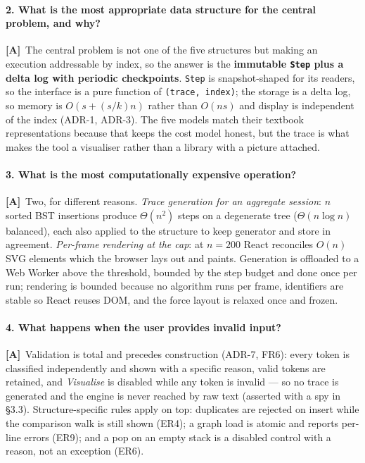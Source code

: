 \documentclass[11pt,a4paper]{article}
\newcommand{\A}{\textcolor{asmc}{\textbf{[A]}}}     %
\newcommand{\ct}[1]{\texttt{#1}}
\begin{document}
\paragraph{2. What is the most appropriate data structure for the central problem, and why?}
\A\ The central problem is not one of the five structures but making an execution addressable by
index, so the answer is the \textbf{immutable \ct{Step} plus a delta log with periodic
checkpoints}. \ct{Step} is snapshot-shaped for its readers, so the interface is a pure function
of \ct{(trace, index)}; the storage is a delta log, so memory is $O(s + (s/k)n)$ rather than
$O(ns)$ and display is independent of the index (ADR-1, ADR-3). The five models match their
textbook representations because that keeps the cost model honest, but the trace is what makes
the tool a visualiser rather than a library with a picture attached.

\paragraph{3. What is the most computationally expensive operation?}
\A\ Two, for different reasons. \emph{Trace generation for an aggregate session}: $n$ sorted BST
insertions produce $\Theta(n^2)$ steps on a degenerate tree ($\Theta(n\log n)$ balanced), each
also applied to the structure to keep generator and store in agreement. \emph{Per-frame rendering
at the cap}: at $n=200$ React reconciles $O(n)$ SVG elements which the browser lays out and
paints. Generation is offloaded to a Web Worker above the threshold, bounded by the step budget
and done once per run; rendering is bounded because no algorithm runs per frame, identifiers are
stable so React reuses DOM, and the force layout is relaxed once and frozen.

\paragraph{4. What happens when the user provides invalid input?}
\A\ Validation is total and precedes construction (ADR-7, FR6): every token is classified
independently and shown with a specific reason, valid tokens are retained, and \emph{Visualise}
is disabled while any token is invalid --- so no trace is generated and the engine is never
reached by raw text (asserted with a spy in \S3.3). Structure-specific rules apply on top:
duplicates are rejected on insert while the comparison walk is still shown (ER4); a graph load is
atomic and reports per-line errors (ER9); and a pop on an empty stack is a disabled control with
a reason, not an exception (ER6).
\end{document}
